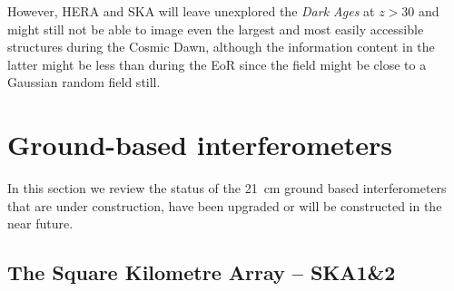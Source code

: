 However,  HERA and SKA will leave unexplored the {\sl Dark Ages} at $z>30$ and might still not be able to image even the largest and most easily accessible structures during the Cosmic Dawn, although the information content in the latter might be less than during the EoR since the field might be close to a Gaussian random field still.  

\section{Ground-based interferometers}

In this section we review the status of the 21~cm ground based interferometers that are under construction, have been upgraded or will be constructed in the near future.

\subsection{The Square Kilometre Array -- SKA1\&2}

